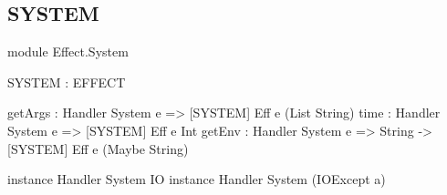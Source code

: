 \subsection{SYSTEM}

\begin{code}
module Effect.System

SYSTEM : EFFECT

getArgs : Handler System e =>           { [SYSTEM] } Eff e (List String)
time    : Handler System e =>           { [SYSTEM] } Eff e Int
getEnv  : Handler System e => String -> { [SYSTEM] } Eff e (Maybe String)

instance Handler System IO
instance Handler System (IOExcept a)
\end{code}



